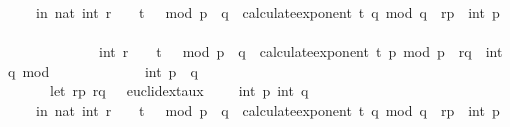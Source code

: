 \begin{isabellebody}
\ \ \ \ \ in\ nat\ {\isacharparenleft}{\kern0pt}{\isacharparenleft}{\kern0pt}int\ {\isacharparenleft}{\kern0pt}{\isacharparenleft}{\kern0pt}r\ {\isacharcircum}{\kern0pt}\ {}\ {\isacharcircum}{\kern0pt}\ {\isacharparenleft}{\kern0pt}t\ {\isacharplus}{\kern0pt}\ {}{\isacharparenright}{\kern0pt}\ mod\ {\isacharparenleft}{\kern0pt}p\ {\isacharasterisk}{\kern0pt}\ q{\isacharparenright}{\kern0pt}{\isacharparenright}{\kern0pt}\ {\isacharcircum}{\kern0pt}\ calculate{\isacharunderscore}{\kern0pt}exponent\ t\ q\ mod\ q{\isacharparenright}{\kern0pt}\ {\isacharasterisk}{\kern0pt}\ r{\isacharunderscore}{\kern0pt}p\ {\isacharasterisk}{\kern0pt}\ int\ p\ {\isacharplus}{\kern0pt}\isanewline
\ \ \ \ \ \ \ \ \ \ \ \ \ \ int\ {\isacharparenleft}{\kern0pt}{\isacharparenleft}{\kern0pt}r\ {\isacharcircum}{\kern0pt}\ {}\ {\isacharcircum}{\kern0pt}\ {\isacharparenleft}{\kern0pt}t\ {\isacharplus}{\kern0pt}\ {}{\isacharparenright}{\kern0pt}\ mod\ {\isacharparenleft}{\kern0pt}p\ {\isacharasterisk}{\kern0pt}\ q{\isacharparenright}{\kern0pt}{\isacharparenright}{\kern0pt}\ {\isacharcircum}{\kern0pt}\ calculate{\isacharunderscore}{\kern0pt}exponent\ t\ p\ mod\ p{\isacharparenright}{\kern0pt}\ {\isacharasterisk}{\kern0pt}\ r{\isacharunderscore}{\kern0pt}q\ {\isacharasterisk}{\kern0pt}\ int\ q{\isacharparenright}{\kern0pt}\ mod\isanewline
\ \ \ \ \ \ \ \ \ \ \ \ \ int\ {\isacharparenleft}{\kern0pt}p\ {\isacharasterisk}{\kern0pt}\ q{\isacharparenright}{\kern0pt}{\isacharparenright}{\kern0pt}{\isacharparenright}{\kern0pt}\ {\isacharequal}{\kern0pt}\ \isanewline
\ \ \ \ \ \ \ {\isacharparenleft}{\kern0pt}let\ {\isacharparenleft}{\kern0pt}{\isacharparenleft}{\kern0pt}r{\isacharunderscore}{\kern0pt}p{\isacharcomma}{\kern0pt}\ r{\isacharunderscore}{\kern0pt}q{\isacharparenright}{\kern0pt}{\isacharcomma}{\kern0pt}\ {\isacharunderscore}{\kern0pt}{\isacharparenright}{\kern0pt}\ {\isacharequal}{\kern0pt}\ euclid{\isacharunderscore}{\kern0pt}ext{\isacharunderscore}{\kern0pt}aux\ {}\ {}\ {}\ {}\ {\isacharparenleft}{\kern0pt}int\ p{\isacharparenright}{\kern0pt}\ {\isacharparenleft}{\kern0pt}int\ q{\isacharparenright}{\kern0pt}\isanewline
\ \ \ \ \ in\ nat\ {\isacharparenleft}{\kern0pt}{\isacharparenleft}{\kern0pt}int\ {\isacharparenleft}{\kern0pt}{\isacharparenleft}{\kern0pt}r\ {\isacharcircum}{\kern0pt}\ {}\ {\isacharcircum}{\kern0pt}\ {\isacharparenleft}{\kern0pt}t\ {\isacharplus}{\kern0pt}\ {}{\isacharparenright}{\kern0pt}\ mod\ {\isacharparenleft}{\kern0pt}p\ {\isacharasterisk}{\kern0pt}\ q{\isacharparenright}{\kern0pt}{\isacharparenright}{\kern0pt}\ {\isacharcircum}{\kern0pt}\ calculate{\isacharunderscore}{\kern0pt}exponent\ t\ q\ mod\ q{\isacharparenright}{\kern0pt}\ {\isacharasterisk}{\kern0pt}\ r{\isacharunderscore}{\kern0pt}p\ {\isacharasterisk}{\kern0pt}\ int\ p\ {\isacharplus}{\kern0pt}\isanewline

\end{isabellebody}

